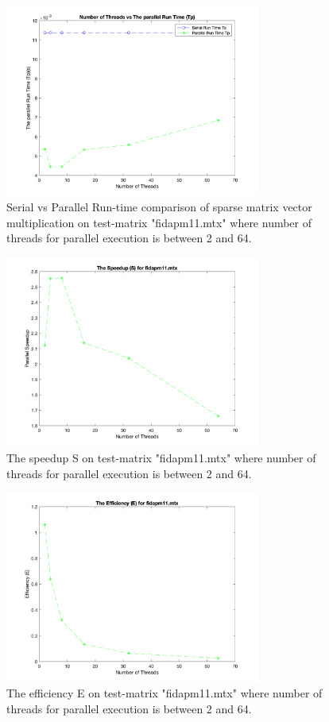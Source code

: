 \documentclass[a4paper,11pt]{article}
\theoremstyle{mytheor}
\begin{document}
\begin{figure}[!htb]
    \centering
    \includegraphics[width=0.75\textwidth]{f2}
    \caption{Serial vs Parallel Run-time comparison of sparse matrix vector multiplication on test-matrix "fidapm11.mtx" where number of threads for parallel execution is between 2 and 64.}
\end{figure}

\begin{figure}[!htb]
    \centering
    \includegraphics[width=0.75\textwidth]{s2}
    \caption{The speedup S on test-matrix "fidapm11.mtx" where number of threads for parallel execution is between 2 and 64.}
\end{figure}

\begin{figure}[!htb]
    \centering
    \includegraphics[width=0.75\textwidth]{e2}
    \caption{The efficiency E on test-matrix "fidapm11.mtx" where number of threads for parallel execution is between 2 and 64.}
\end{figure}
\end{document}
